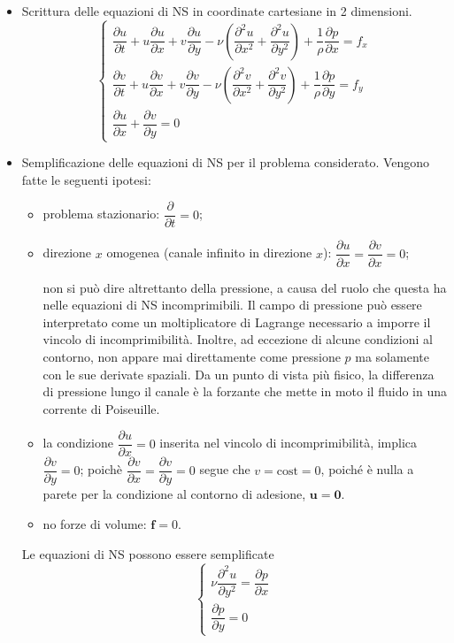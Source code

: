 \begin{itemize}

  \item Scrittura delle equazioni di NS in coordinate cartesiane in 2 dimensioni.
%  
 \begin{equation}
\begin{cases}
  \dfrac{\partial u}{\partial t} + u \dfrac{\partial u}{\partial x}
  + v \dfrac{\partial u}{\partial y} - \nu \left( 
  \dfrac{\partial^2 u}{\partial x^2} +
  \dfrac{\partial^2 u}{\partial y^2} \right)
  + \dfrac{1}{\rho} \dfrac{\partial p}{\partial x} = f_x \\
  \dfrac{\partial v}{\partial t} + u \dfrac{\partial v}{\partial x}
  + v \dfrac{\partial v}{\partial y} - \nu \left( 
  \dfrac{\partial^2 v}{\partial x^2} +
  \dfrac{\partial^2 v}{\partial y^2} \right)
  + \dfrac{1}{\rho} \dfrac{\partial p}{\partial y} = f_y \\
  \dfrac{\partial u}{\partial x} + \dfrac{\partial v}{\partial y} = 0
\end{cases}
\end{equation}

  \item Semplificazione delle equazioni di NS per il problema considerato. Vengono fatte le seguenti ipotesi:
\begin{itemize}
\item problema stazionario: $\dfrac{\partial}{\partial t} = 0$;
\item direzione $x$ omogenea (canale infinito in direzione $x$): $\dfrac{\partial u}{\partial x} = \dfrac{\partial v}{\partial x} = 0$; 
\begin{remark}
non si può dire altrettanto della pressione, a causa del ruolo che questa ha nelle equazioni di NS incomprimibili. Il campo di pressione può essere interpretato come un moltiplicatore di Lagrange necessario a imporre il vincolo di incomprimibilità. Inoltre, ad eccezione di alcune condizioni al contorno, non appare mai direttamente come pressione $p$ ma solamente con le sue derivate spaziali. Da un punto di vista più fisico, la differenza di pressione lungo il canale è la forzante che mette in moto il fluido in una corrente di Poiseuille.
\end{remark}
\item la condizione $\dfrac{\partial u}{\partial x} = 0$ inserita nel vincolo di incomprimibilità, implica $\dfrac{\partial v}{\partial y}=0$; poichè $\dfrac{\partial v}{\partial x}=\dfrac{\partial v}{\partial y}=0$ segue che $v = \text{cost} = 0$, poiché è nulla a parete per la condizione al contorno di adesione, $\bm{u} = \bm{0}$.
\item no forze di volume: $\bm{f} = 0$.
\end{itemize}
%
Le equazioni di NS possono essere semplificate
\begin{equation}
\begin{cases}
  \nu \dfrac{\partial^2 u}{\partial y^2} = \dfrac{\partial p}{\partial x} \\
  \dfrac{\partial p}{\partial y} = 0  
\end{cases}
\end{equation}


\end{itemize}
